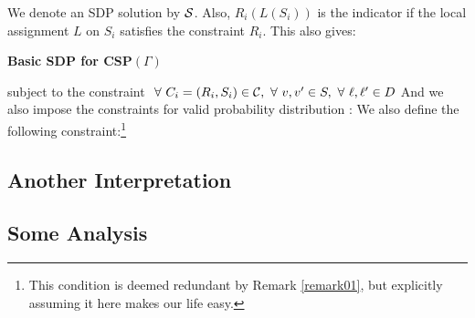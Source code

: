 \iffalse
We denote an SDP solution by $\mathcal{S}$. Also, $R_i(L(S_i))$ is the indicator if the local assignment $L$ on $S_i$ satisfies the constraint $R_i$. This also gives: 
\begin{definition}{\label{def1}}
{\bf Basic SDP for CSP$(\Gamma)$}  

subject to the constraint $\ \forall \  C_i = (R_i, S_i) \in \mathcal{C},\ \forall \  v, v' \in S, \ \forall \  \ell, \ell' \in D $
And we also impose the constraints for valid probability distribution : 
We also define the following constraint:\footnote{This condition is deemed redundant by Remark \ref{remark01}, but explicitly assuming it here makes our life easy.} 
\end{definition}

\subsection{Another Interpretation}



\subsection{Some Analysis}


